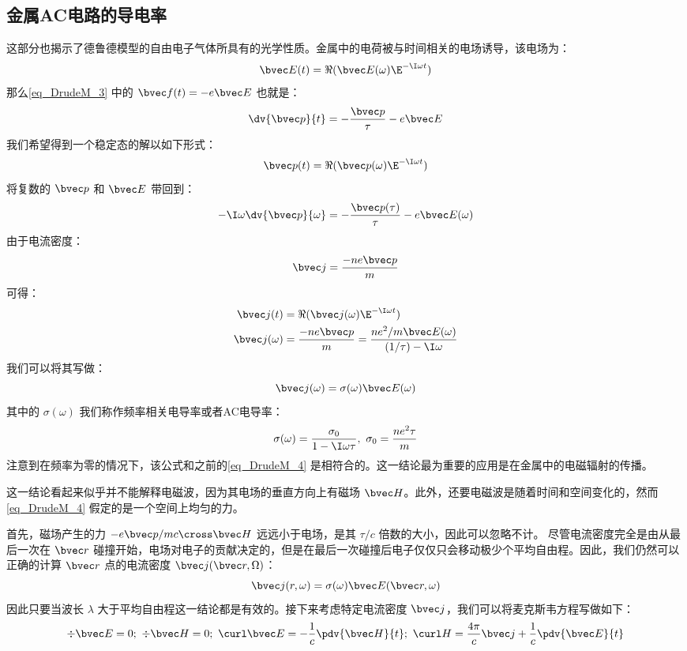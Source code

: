 \subsection{金属AC电路的导电率}
这部分也揭示了德鲁德模型的自由电子气体所具有的光学性质。金属中的电荷被与时间相关的电场诱导，该电场为：
\begin{equation}
\bvec E(t)=\Re(\bvec E(\omega)\E^{-\I\omega t})
\end{equation}
那么\autoref{eq_DrudeM_3} 中的 $\bvec f(t)=-e\bvec E$ 也就是：
\begin{equation}
\dv{\bvec p}{t}=-\frac{\bvec p}{\tau}-e\bvec E
\end{equation}
我们希望得到一个稳定态的解以如下形式：
\begin{equation}
\bvec p(t)=\Re(\bvec p(\omega)\E^{-\I\omega t})
\end{equation}
将复数的 $\bvec p$ 和 $\bvec E$ 带回到：
\begin{equation}
-\I\omega\dv{\bvec p}{\omega}=-\frac{\bvec p(\tau)}{\tau}-e\bvec E(\omega)
\end{equation}
由于电流密度：
\begin{equation}
\bvec j = \frac{-ne\bvec p}{m}
\end{equation}
可得：
\begin{align}
\bvec j(t)&=\Re(\bvec j(\omega)\E^{-\I\omega t})\\
\bvec j(\omega)&=\frac{-ne\bvec p}{m}=\frac{ne^2/m\bvec E(\omega)}{(1/\tau)-\I\omega}
\end{align}
我们可以将其写做：
\begin{equation}
\bvec j(\omega)=\sigma(\omega)\bvec E(\omega)
\end{equation}
其中的 $\sigma(\omega)$ 我们称作频率相关电导率或者AC电导率：
\begin{equation}
\sigma(\omega)=\frac{\sigma_0}{1-\I\omega\tau},\ \sigma_0=\frac{ne^2\tau}{m}
\end{equation}
注意到在频率为零的情况下，该公式和之前的\autoref{eq_DrudeM_4} 是相符合的。这一结论最为重要的应用是在金属中的电磁辐射的传播。

这一结论看起来似乎并不能解释电磁波，因为其电场的垂直方向上有磁场 $\bvec H$。此外，还要电磁波是随着时间和空间变化的，然而\autoref{eq_DrudeM_4} 假定的是一个空间上均匀的力。

首先，磁场产生的力 $-e\bvec p/mc\cross \bvec H$ 远远小于电场，是其 $\tau/c$ 倍数的大小，因此可以忽略不计。
尽管电流密度完全是由从最后一次在 $\bvec r$ 碰撞开始，电场对电子的贡献决定的，但是在最后一次碰撞后电子仅仅只会移动极少个平均自由程。因此，我们仍然可以正确的计算 $\bvec r$ 点的电流密度 $\bvec j(\bvec r,\Omega)$：
\begin{equation}
\bvec j(r,\omega)=\sigma(\omega)\bvec E(\bvec r,\omega)
\end{equation}
因此只要当波长 $\lambda$ 大于平均自由程这一结论都是有效的。接下来考虑特定电流密度 $\bvec j$，我们可以将麦克斯韦方程写做如下：
\begin{equation}
\div \bvec E =0;\ \div \bvec H = 0;\ \curl \bvec E =-\frac{1}{c}\pdv{ \bvec H}{t};\ \curl H = \frac{4\pi}{c}\bvec j+\frac{1}{c}\pdv{ \bvec E}{t}
\end{equation}

